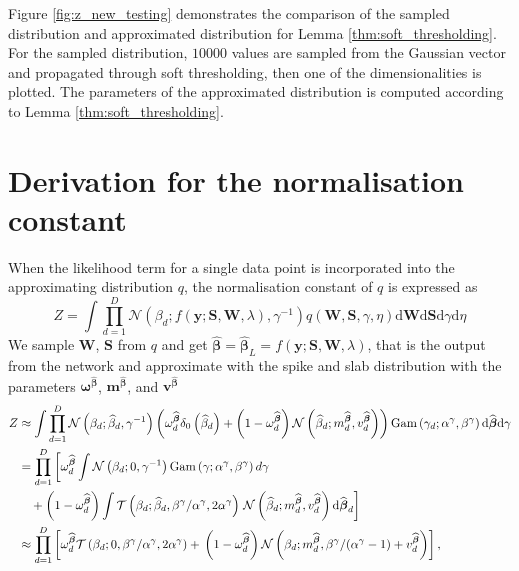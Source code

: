 \documentclass{article}
\begin{document}
Figure \ref{fig:z_new_testing} demonstrates the comparison of the sampled distribution and approximated distribution for Lemma \ref{thm:soft_thresholding}. For the sampled distribution, $10000$ values are sampled from the Gaussian vector and propagated through soft thresholding, then one of the dimensionalities is plotted. The parameters of the approximated distribution is computed according to Lemma \ref{thm:soft_thresholding}.

\section{Derivation for the normalisation constant}
When the likelihood term for a single data point is incorporated into the approximating distribution $q$, the normalisation constant of $q$ is expressed as
\begin{equation}
\label{eq:Z}
Z = \int \prod_{d=1}^{D} \mathcal{N}(\beta_d ; f(\mathbf{y} ; \mathbf{S}, \mathbf{W}, \lambda), \gamma^{-1}) q(\mathbf{W}, \mathbf{S}, \gamma, \eta) \mathrm{d}\mathbf{W} \mathrm{d}\mathbf{S} \mathrm{d}\gamma \mathrm{d}\eta
\end{equation}
We sample $\mathbf{W}$, $\mathbf{S}$ from $q$ and get $\widehat{\boldsymbol\beta} = \widehat{\boldsymbol\beta}_L = f(\mathbf{y} ; \mathbf{S}, \mathbf{W}, \lambda)$, that is the output from the network and approximate with the spike and slab distribution with the parameters $\boldsymbol\omega^{\widehat{\boldsymbol\beta}}$, $\mathbf{m}^{\widehat{\boldsymbol\beta}}$, and $\mathbf{v}^{\widehat{\boldsymbol\beta}}$
\begin{align}
Z &\approx \int \prod_{d=1}^{D} \mathcal{N}\left(\beta_d ; \widehat{\beta}_d, \gamma^{-1}\right) \left(\omega^{\widehat{\boldsymbol\beta}}_d \delta_0\left(\widehat{\beta}_d\right) + \left(1 - \omega^{\widehat{\boldsymbol\beta}}_d\right)\mathcal{N}\left(\widehat{\beta}_d ; m^{\widehat{\boldsymbol\beta}}_d, v^{\widehat{\boldsymbol\beta}}_d\right)\right) \text{Gam} \left(\gamma_d; \alpha^\gamma, \beta^\gamma\right)\mathrm{d}\widehat{\boldsymbol\beta} \mathrm{d}\gamma  \nonumber\\
& = \prod_{d=1}^{D} \left[\omega^{\widehat{\boldsymbol\beta}}_d \int \mathcal{N}\left(\beta_d ; 0, \gamma^{-1}\right)  \text{Gam} \left(\gamma; \alpha^\gamma, \beta^\gamma\right) d\gamma  \nonumber \right.\\
&\quad + \left(1 - \omega^{\widehat{\boldsymbol\beta}}_d\right)\int \mathcal{T}\left(\beta_d ; \widehat{\beta}_d, \beta^\gamma / \alpha^\gamma, 2\alpha^\gamma\right) 
\left. \vphantom{\int}  \mathcal{N}\left(\widehat{\beta}_d ; m^{\widehat{\boldsymbol\beta}}_d, v^{\widehat{\boldsymbol\beta}}_d\right) \mathrm{d}\widehat{\boldsymbol\beta}_d\right]  \nonumber\\
\label{eq:Z_approx}
& \approx \prod_{d=1}^D \left[\omega^{\widehat{\boldsymbol\beta}}_d  \mathcal{T}\left(\beta_d ; 0, \beta^\gamma / \alpha^\gamma, 2\alpha^\gamma\right) + \vphantom{m^{\widehat{\boldsymbol\beta}}_d} \left(1 - \omega^{\widehat{\boldsymbol\beta}}_d\right)\mathcal{N}\left(\beta_d ; m^{\widehat{\boldsymbol\beta}}_d,  \beta^\gamma / (\alpha^\gamma - 1) + v^{\widehat{\boldsymbol\beta}}_d\right)\right],
\end{align}
\end{document}
